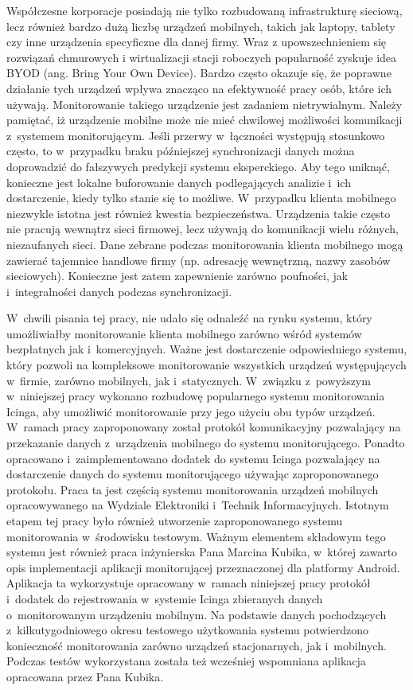Współczesne korporacje posiadają nie tylko rozbudowaną infrastrukturę
sieciową, lecz również bardzo dużą liczbę urządzeń mobilnych, takich
jak laptopy, tablety czy inne urządzenia specyficzne dla danej
firmy. Wraz z upowszechnieniem się rozwiązań chmurowych i
wirtualizacji stacji roboczych popularność zyskuje idea BYOD
(ang. Bring Your Own Device). Bardzo często okazuje się, że poprawne
działanie tych urządzeń wpływa znacząco na efektywność pracy osób,
które ich używają. Monitorowanie takiego urządzenie jest zadaniem
nietrywialnym. Należy pamiętać, iż urządzenie mobilne może nie mieć
chwilowej możliwości komunikacji z~systemem monitorującym. Jeśli
przerwy w~łączności występują stosunkowo często, to w~przypadku braku
późniejszej synchronizacji danych można doprowadzić do fałszywych
predykcji systemu eksperckiego. Aby tego uniknąć, konieczne jest
lokalne buforowanie danych podlegających analizie i~ich dostarczenie,
kiedy tylko stanie się to możliwe. W~przypadku klienta mobilnego
niezwykle istotna jest również kwestia bezpieczeństwa. Urządzenia
takie często nie pracują wewnątrz sieci firmowej, lecz używają do
komunikacji wielu różnych, niezaufanych sieci. Dane zebrane podczas
monitorowania klienta mobilnego mogą zawierać tajemnice handlowe firmy
(np. adresację wewnętrzną, nazwy zasobów sieciowych). Konieczne jest
zatem zapewnienie zarówno poufności, jak i~integralności danych
podczas synchronizacji.

W~chwili pisania tej pracy, nie udało się odnaleźć na rynku systemu,
który umożliwiałby monitorowanie klienta mobilnego zarówno wśród
systemów bezpłatnych jak i~komercyjnych. Ważne jest dostarczenie
odpowiedniego systemu, który pozwoli na kompleksowe monitorowanie
wszystkich urządzeń występujących w~firmie, zarówno mobilnych, jak
i~statycznych. W~związku z~powyższym w~niniejszej pracy wykonano
rozbudowę popularnego systemu monitorowania Icinga, aby umożliwić
monitorowanie przy jego użyciu obu typów urządzeń. W~ramach pracy
zaproponowany został protokół komunikacyjny pozwalający na przekazanie
danych z~urządzenia mobilnego do systemu monitorującego. Ponadto
opracowano i~zaimplementowano dodatek do systemu Icinga pozwalający na
dostarczenie danych do systemu monitorującego używając zaproponowanego
protokołu. Praca ta jest częścią systemu monitorowania urządzeń
mobilnych opracowywanego na Wydziale Elektroniki i~Technik
Informacyjnych. Istotnym etapem tej pracy było również utworzenie
zaproponowanego systemu monitorowania w~środowisku testowym. Ważnym
elementem składowym tego systemu jest również praca inżynierska Pana
Marcina Kubika\cite{book:pracaKubika}, w~której zawarto opis
implementacji aplikacji monitorującej przeznaczonej dla platformy
Android. Aplikacja ta wykorzystuje opracowany w~ramach niniejszej
pracy protokół i~dodatek do rejestrowania w~systemie Icinga zbieranych
danych o~monitorowanym urządzeniu mobilnym. Na podstawie danych
pochodzących z~kilkutygodniowego okresu testowego użytkowania systemu
potwierdzono konieczność monitorowania zarówno urządzeń stacjonarnych,
jak i~mobilnych. Podczas testów wykorzystana została też wcześniej
wspomniana aplikacja opracowana przez Pana Kubika.


